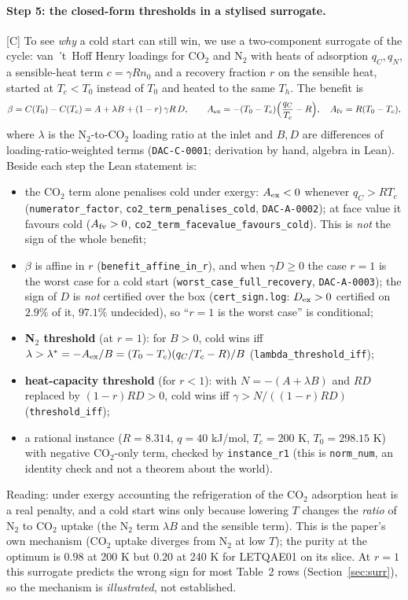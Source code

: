 \documentclass[10pt]{article}
\newcommand{\tier}[1]{\textsf{[#1]}}
\newcommand{\tC}{\tier{C}}
\newcommand{\lean}[1]{\texttt{#1}}
\newcommand{\id}[1]{\texttt{DAC-#1}}
\begin{document}
\paragraph{Step 5: the closed-form thresholds in a stylised surrogate.}\tC{} To see \emph{why} a cold start can still win, we use a two-component surrogate of the cycle: van~'t~Hoff Henry loadings for CO$_2$ and N$_2$ with heats of adsorption $q_C,q_N$, a sensible-heat
term $c=\gamma Rn_0$ and a recovery fraction $r$ on the sensible heat, started at $T_c<T_0$ instead of $T_0$ and heated to the same $T_h$. The benefit is
\[\beta=C(T_0)-C(T_c)=A+\lambda B+(1-r)\,\gamma R\,D,\qquad A_{\rm ex}=-(T_0-T_c)\Bigl(\frac{q_C}{T_c}-R\Bigr),\quad A_{\rm fv}=R(T_0-T_c),\]
where $\lambda$ is the N$_2$-to-CO$_2$ loading ratio at the inlet and $B,D$ are differences of loading-ratio-weighted terms (\id{C-0001}; derivation by hand, algebra in Lean). Beside each step the Lean statement is:
\begin{itemize}\itemsep=1pt
\item the CO$_2$ term alone penalises cold under exergy: $A_{\rm ex}<0$ whenever $q_C>RT_c$ (\lean{numerator\_factor}, \lean{co2\_term\_penalises\_cold}, \id{A-0002}); at face value it favours cold ($A_{\rm fv}>0$, \lean{co2\_term\_facevalue\_favours\_cold}). This is \emph{not} the sign of the whole benefit;
\item $\beta$ is affine in $r$ (\lean{benefit\_affine\_in\_r}), and when $\gamma D\ge0$ the case $r=1$ is the worst case for a cold start (\lean{worst\_case\_full\_recovery}, \id{A-0003}); the sign of $D$ is \emph{not} certified over the box (\texttt{cert\_sign.log}: $D_{\rm ex}>0$ certified on $2.9\%$ of it, $97.1\%$ undecided), so ``$r=1$ is the worst case'' is conditional;
\item \textbf{N$_2$ threshold} (at $r=1$): for $B>0$, cold wins iff $\lambda>\lambda^\ast=-A_{\rm ex}/B=(T_0-T_c)(q_C/T_c-R)/B$ (\lean{lambda\_threshold\_iff});
\item \textbf{heat-capacity threshold} (for $r<1$): with $N=-(A+\lambda B)$ and $RD$ replaced by $(1-r)RD>0$, cold wins iff $\gamma>N/((1-r)RD)$ (\lean{threshold\_iff});
\item a rational instance ($R=8.314$, $q=40$ kJ/mol, $T_c=200$ K, $T_0=298.15$ K) with negative CO$_2$-only term, checked by \lean{instance\_r1} (this is \lean{norm\_num}, an identity check and not a theorem about the world).
\end{itemize}
Reading: under exergy accounting the refrigeration of the CO$_2$ adsorption heat is a real penalty, and a cold start wins only because lowering $T$ changes the \emph{ratio} of N$_2$ to CO$_2$ uptake (the N$_2$ term $\lambda B$ and the sensible term). This is the paper's own mechanism (CO$_2$ uptake diverges from N$_2$ at low $T$); the purity at the optimum is $0.98$ at 200 K but $0.20$ at 240 K for LETQAE01 on its slice.
At $r=1$ this surrogate predicts the wrong sign for most Table~2 rows (Section~\ref{sec:surr}), so the mechanism is \emph{illustrated}, not established.
\end{document}
